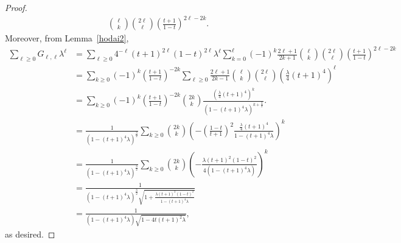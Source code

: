 \documentclass{amsart}
\numberwithin{equation}{section}
\theoremstyle{plain}
\theoremstyle{definition}
\begin{document}
\begin{proof}
\[\begin{aligned}
\binom{\ell}{k} \binom{2\ell}{\ell}
\left(
\frac{t+1}{1-t}
\right)
^{2\ell - 2k}.
\end{aligned}\]
Moreover, from Lemma~\ref{hodai2},
\[\begin{aligned}
\sum_{\ell \ge 0} G_{\ell, \ell} \lambda^\ell
&=
\sum_{\ell \ge 0} 4^{-\ell} 
(t+1)^{2\ell} (1-t)^{2\ell}\lambda^\ell
\sum_{k=0}^\ell
(-1)^{k}
\frac{2\ell+1}{2k+1}
\binom{\ell}{k} \binom{2\ell}{\ell}
\left(
\frac{t+1}{1-t}
\right)
^{2\ell - 2k} \\
&=
\sum_{k \ge 0}
(-1)^k
\left(
\frac{t+1}{1-t}
\right)
^{- 2k}
%
\sum_{\ell \ge 0} 
%
\frac{2\ell+1}{2k-1}
\binom{\ell}{k} \binom{2\ell}{\ell}
\left(
\frac{\lambda}{4}
(t+1)^4
\right)
^{\ell} \\
&=
\sum_{k \ge 0}
(-1)^k
\left(
\frac{t+1}{1-t}
\right)
^{- 2k}
%
\binom{2k}{k}
\frac{\left(
\frac{\lambda}{4}
(t+1)^4
\right)^k}{
\left(1 - (t+1)^4 \lambda \right)^{k+\frac{3}{2}}}.
\\
&=
\frac{1}{
\left(1 - (t+1)^4 \lambda \right)^{\frac{3}{2}}}
\sum_{k \ge 0}
\binom{2k}{k}
\left(
-
\left(
\frac{1-t}{t+1}
\right)^2
\frac{\frac{\lambda}{4}(t+1)^4}{1 - (t+1)^4 \lambda}
\right)^k\\
&=
\frac{1}{
\left(1 - (t+1)^4 \lambda \right)^{\frac{3}{2}}}
\sum_{k \ge 0}
\binom{2k}{k}
\left(
-\frac{\lambda (t+1)^2 (1-t)^2}{4(1 - (t+1)^4 \lambda)}
\right)^k\\
&=
\frac{1}{
\left(1 - (t+1)^4 \lambda \right)^{\frac{3}{2}}
\sqrt{1 +   \frac{ \lambda (t+1)^2 (1-t)^2}{1 - (t+1)^4 \lambda}}}\\
&=
\frac{1}{
(1- (t+1)^4 \lambda)\sqrt{
1-4 t (t+1)^2 \lambda
}},
\end{aligned}\]
as desired.
\end{proof}
\end{document}
